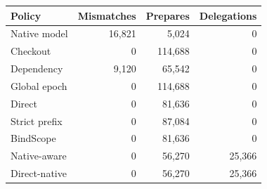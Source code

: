 \begin{tabular}{@{}lrrr@{}}\toprule
Policy & Mismatches & Prepares & Delegations\\\midrule
Native model & 16,821 & 5,024 & 0 \\
Checkout & 0 & 114,688 & 0 \\
Dependency & 9,120 & 65,542 & 0 \\
Global epoch & 0 & 114,688 & 0 \\
Direct & 0 & 81,636 & 0 \\
Strict prefix & 0 & 87,084 & 0 \\
BindScope & 0 & 81,636 & 0 \\
Native-aware & 0 & 56,270 & 25,366 \\
Direct-native & 0 & 56,270 & 25,366 \\
\bottomrule\end{tabular}
